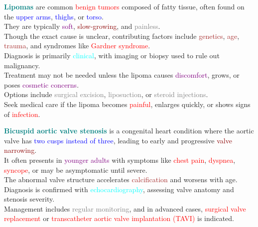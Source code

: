 \documentclass{article}
\begin{document}
\bigskip

\textcolor{teal}{\Large \bf Lipomas} are common \textcolor{red}{benign tumors} composed of fatty tissue, often found on the \textcolor{blue}{upper arms}, \textcolor{blue}{thighs}, or \textcolor{blue}{torso}.\\
They are typically \textcolor{purple}{soft}, \textcolor{darkred}{slow-growing}, and \textcolor{gray}{painless}.\\
Though the exact cause is unclear, contributing factors include \textcolor{brown}{genetics}, \textcolor{brown}{age}, \textcolor{brown}{trauma}, and syndromes like \textcolor{red}{Gardner syndrome}.\\
Diagnosis is primarily \textcolor{cyan}{clinical}, with imaging or biopsy used to rule out malignancy.\\
Treatment may not be needed unless the lipoma causes \textcolor{purple}{discomfort}, grows, or poses \textcolor{purple}{cosmetic concerns}.\\
Options include \textcolor{gray}{surgical excision}, \textcolor{gray}{liposuction}, or \textcolor{gray}{steroid injections}.\\
Seek medical care if the lipoma becomes \textcolor{red}{painful}, enlarges quickly, or shows signs of \textcolor{red}{infection}.

\newpage

\textcolor{teal}{\Large \bf Bicuspid aortic valve stenosis} is a congenital heart condition where the aortic valve has \textcolor{blue}{two cusps instead of three}, leading to early and progressive \textcolor{darkred}{valve narrowing}.\\
It often presents in \textcolor{purple}{younger adults} with symptoms like \textcolor{red}{chest pain}, \textcolor{red}{dyspnea}, \textcolor{red}{syncope}, or may be asymptomatic until severe.\\
The abnormal valve structure accelerates \textcolor{brown}{calcification} and worsens with age.\\
Diagnosis is confirmed with \textcolor{cyan}{echocardiography}, assessing valve anatomy and stenosis severity.\\
Management includes \textcolor{gray}{regular monitoring}, and in advanced cases, \textcolor{red}{surgical valve replacement} or \textcolor{red}{transcatheter aortic valve implantation (TAVI)} is indicated.
\end{document}
